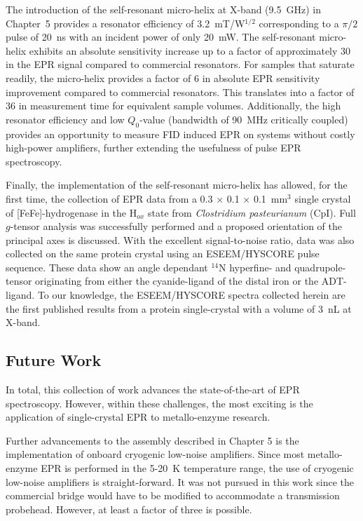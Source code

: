 The introduction of the self-resonant micro-helix at X-band (9.5~GHz) in Chapter~5 provides a resonator efficiency of 3.2~mT/W$^{1/2}$ corresponding to a $\pi/2$ pulse of 20~ns with an incident power of only 20~mW. The self-resonant micro-helix exhibits an absolute sensitivity increase up to a factor of approximately 30 in the EPR signal compared to commercial resonators. For samples that saturate readily, the micro-helix provides a factor of 6 in absolute EPR sensitivity improvement compared to commercial resonators. This translates into a factor of 36 in measurement time for equivalent sample volumes. Additionally, the high resonator efficiency and low $Q_0$-value (bandwidth of 90~MHz critically coupled) provides an opportunity to measure FID induced EPR on systems without costly high-power amplifiers, further extending the usefulness of pulse EPR spectroscopy.

Finally, the implementation of the self-resonant micro-helix has allowed, for the first time, the collection of EPR data from a 0.3 $\times$ 0.1 $\times$ 0.1~mm$^3$ single crystal of [FeFe]-hydrogenase in the H$_{ox}$ state from {\em Clostridium pasteurianum} (CpI). Full $g$-tensor analysis was successfully performed and a proposed orientation of the principal axes is discussed. With the excellent signal-to-noise ratio, data was also collected on the same protein crystal using an ESEEM/HYSCORE pulse sequence. These data show an angle dependant $^{14}$N hyperfine- and quadrupole-tensor originating from either the cyanide-ligand of the distal iron or the ADT-ligand.  To our knowledge, the ESEEM/HYSCORE spectra collected herein are the first published results from a protein single-crystal with a volume of 3~nL at X-band. 

\subsection*{Future Work}

In total, this collection of work advances the state-of-the-art of EPR spectroscopy. However, within these challenges, the most exciting is the application of single-crystal EPR to metallo-enzyme research. 

Further advancements to the assembly described in Chapter 5 is the implementation of onboard cryogenic low-noise amplifiers. Since most metallo-enzyme EPR is performed in the 5-20~K temperature range, the use of cryogenic low-noise amplifiers is straight-forward. It was not pursued in this work since the commercial bridge would have to be modified to accommodate a transmission probehead. However, at least a factor of three is possible. \cite{NARKOWICZ201379} 

